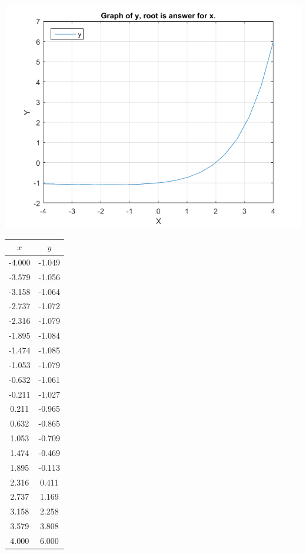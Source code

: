 \documentclass[12pt]{article}
\begin{document}
\begin{enumerate}[label=\textbf{\arabic*}.]
\begin{minipage}{.68\linewidth}
\includegraphics[scale=0.60]{Part3Graph.png}
\end{minipage}
\begin{minipage}{.3\linewidth}
\begin{tabular}{c | c}
$x$ & $y$ \\
\hline
-4.000	&	-1.049	\\
\hline
-3.579	&	-1.056	\\
\hline
-3.158	&	-1.064	\\
\hline
-2.737	&	-1.072	\\
\hline
-2.316	&	-1.079	\\
\hline
-1.895	&	-1.084	\\
\hline
-1.474	&	-1.085	\\
\hline
-1.053	&	-1.079	\\
\hline
-0.632	&	-1.061	\\
\hline
-0.211	&	-1.027	\\
\hline
0.211	&	-0.965	\\
\hline
0.632	&	-0.865	\\
\hline
1.053	&	-0.709	\\
\hline
1.474	&	-0.469	\\
\hline
\rowcolor{yellow!50}1.895	&	-0.113	\\
\hline
\rowcolor{yellow!50}2.316	&	0.411	\\
\hline
2.737	&	1.169	\\
\hline
3.158	&	2.258	\\
\hline
3.579	&	3.808	\\
\hline
4.000	&	6.000	\\


\end{tabular}
\end{minipage}
\end{enumerate}
\end{document}
